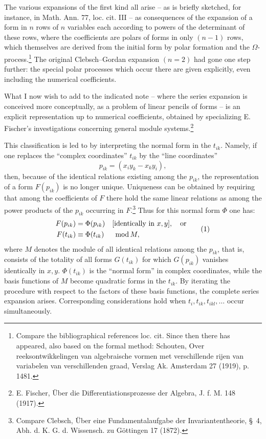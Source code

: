 \documentclass[11pt]{article}
\newcommand{\modu}[1]{\;\operatorname{mod} #1}
\providecommand{\modu}[1]{\;\operatorname{mod} #1}
\begin{document}
The various expansions of the first kind all arise -- as is briefly sketched, for instance, in Math. Ann. 77, loc. cit. III -- as consequences of the expansion of a form in $n$ rows of $n$ variables each according to powers of the determinant of these rows, where the coefficients are polars of forms in only $(n-1)$ rows, which themselves are derived from the initial form by polar formation and the $\Omega$-process.\footnote{Compare the bibliographical references loc. cit. Since then there has appeared, also based on the formal method: Schouten, Over reeksontwikkelingen van algebraische vormen met verschillende rijen van variabelen van verschillenden graad, Verslag Ak. Amsterdam 27 (1919), p. 1481.} The original Clebsch--Gordan expansion $(n=2)$ had gone one step further: the special polar processes which occur there are given explicitly, even including the numerical coefficients.

What I now wish to add to the indicated note -- where the series expansion is conceived more conceptually, as a problem of linear pencils of forms -- is an explicit representation up to numerical coefficients, obtained by specializing E. Fischer's investigations concerning general module systems.\footnote{E. Fischer, Über die Differentiationsprozesse der Algebra, J. f. M. 148 (1917).}

This classification is led to by interpreting the normal form in the $t_{ik}$. Namely, if one replaces the ``complex coordinates'' $t_{ik}$ by the ``line coordinates''
\[
        p_{ik}=(x_i y_k-x_k y_i),
\]
then, because of the identical relations existing among the $p_{ik}$, the representation of a form $F(p_{ik})$ is no longer unique. Uniqueness can be obtained by requiring that among the coefficients of $F$ there hold the same linear relations as among the power products of the $p_{ik}$ occurring in $F$.\footnote{Compare Clebsch, Über eine Fundamentalaufgabe der Invariantentheorie, \S~4, Abh. d. K. G. d. Wissensch. zu Göttingen 17 (1872).} Thus for this normal form $\Phi$ one has:
\begin{equation}
\begin{aligned}
        F(p_{ik})&=\Phi(p_{ik}) &&[\text{identically in }x,y],\quad\text{or}\notag\\
        F(t_{ik})&\equiv\Phi(t_{ik}) &&\modu{M},
\end{aligned}
\tag{1}
\end{equation}
where $M$ denotes the module of all identical relations among the $p_{ik}$, that is, consists of the totality of all forms $G(t_{ik})$ for which $G(p_{ik})$ vanishes identically in $x,y$. $\Phi(t_{ik})$ is the ``normal form'' in complex coordinates, while the basis functions of $M$ become quadratic forms in the $t_{ik}$. By iterating the procedure with respect to the factors of these basis functions, the complete series expansion arises. Corresponding considerations hold when $t_i,t_{ik},t_{ikl},\ldots$ occur simultaneously.
\end{document}
